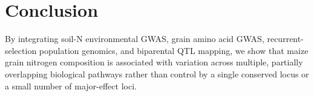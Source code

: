 

\section{Conclusion}\label{sec13}

By integrating soil-N environmental GWAS, grain amino acid GWAS, recurrent-selection population genomics, and biparental QTL mapping, we show that maize grain nitrogen composition is associated with variation across multiple, partially overlapping biological pathways rather than control by a single conserved locus or a small number of major-effect loci.

